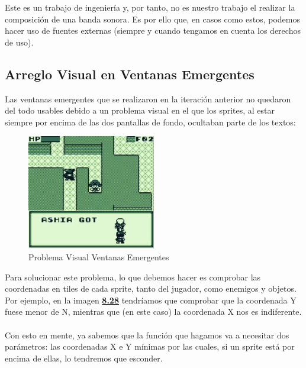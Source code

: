Este es un trabajo de ingeniería y, por tanto, no es nuestro trabajo el realizar la composición de una banda sonora. Es por ello que, en casos como estos, podemos hacer uso de fuentes externas (siempre y cuando tengamos en cuenta los derechos de uso).

\subsection{Arreglo Visual en Ventanas Emergentes}

Las ventanas emergentes que se realizaron en la iteración anterior no quedaron del todo usables debido a un problema visual en el que los sprites, al estar siempre por encima de las dos pantallas de fondo, ocultaban parte de los textos:

\begin{figure}[h]
\centering
\includegraphics[width=0.5\textwidth]{include/images/desarrollo/hudissue.png}
\caption{Problema Visual Ventanas Emergentes}
\label{figure:hudissue}
\end{figure}

Para solucionar este problema, lo que debemos hacer es comprobar las coordenadas en tiles de cada sprite, tanto del jugador, como enemigos y objetos. Por ejemplo, en la imagen \hyperref[figure:hudissue]{\textbf{8.28}} tendríamos que comprobar que la coordenada Y fuese menor de N, mientras que (en este caso) la coordenada X nos es indiferente.
\\ \\
Con esto en mente, ya sabemos que la función que hagamos va a necesitar dos parámetros: las coordenadas X e Y mínimas por las cuales, si un sprite está por encima de ellas, lo tendremos que esconder.

